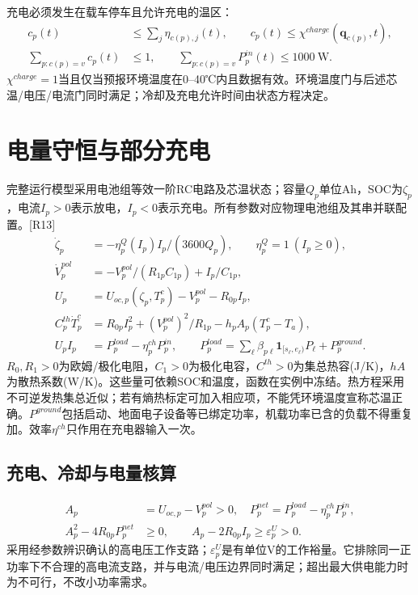 \noindent 充电必须发生在载车停车且允许充电的温区：
\begin{align}
 c_p(t)&\le\sum_j\eta_{c(p),j}(t),\qquad c_p(t)\le\chi^{charge}(\mathbf q_{c(p)},t),\\
 \sum_{p:c(p)=v}c_p(t)&\le1,\qquad
 \sum_{p:c(p)=v}P_p^{in}(t)\le1000\ \mathrm W.
 \label{eng:eq:chargingcapacity}
\end{align}
\noindent $\chi^{charge}=1$当且仅当预报环境温度在0--40℃内且数据有效。环境温度门与后述芯温/电压/电流门同时满足；冷却及充电允许时间由状态方程决定。
\clearpage

\section{电量守恒与部分充电}
\noindent 完整运行模型采用电池组等效一阶RC电路及芯温状态；容量$Q_p$单位Ah，SOC为$\zeta_p$，电流$I_p>0$表示放电，$I_p<0$表示充电。所有参数对应物理电池组及其串并联配置。[R13]
\begin{align}
 \dot\zeta_p&=-\eta_p^Q(I_p)I_p/(3600Q_p),\qquad
 \eta_p^Q=1\ (I_p\ge0),\label{eng:eq:battery}\\
 \dot V_p^{pol}&=-V_p^{pol}/(R_{1p}C_{1p})+I_p/C_{1p},\\
 U_p&=U_{oc,p}(\zeta_p,T_p^c)-V_p^{pol}-R_{0p}I_p,\label{eng:eq:ecm}\\
 C_p^{th}\dot T_p^c&=R_{0p}I_p^2+(V_p^{pol})^2/R_{1p}
                  -h_pA_p(T_p^c-T_a),\label{eng:eq:thermal}\\
 U_pI_p&=P_p^{load}-\eta_p^{ch}P_p^{in},\qquad
 P_p^{load}=\sum_\ell\beta_{p\ell}\mathbf1_{[s_\ell,e_\ell)}P_\ell+P_p^{ground}.
 \label{eng:eq:powerport}
\end{align}
\noindent $R_0,R_1>0$为欧姆/极化电阻，$C_1>0$为极化电容，$C^{th}>0$为集总热容(J/K)，$hA$为散热系数(W/K)。这些量可依赖SOC和温度，函数在实例中冻结。热方程采用不可逆发热集总近似；若有熵热标定可加入相应项，不能凭环境温度宣称芯温正确。$P^{ground}$包括启动、地面电子设备等已绑定功率，机载功率已含的负载不得重复加。效率$\eta^{ch}$只作用在充电器输入一次。
\clearpage\subsection*{充电、冷却与电量核算}
\begin{align}
 A_p&=U_{oc,p}-V_p^{pol}>0,\quad P_p^{net}=P_p^{load}-\eta_p^{ch}P_p^{in},\\
 A_p^2-4R_{0p}P_p^{net}&\ge0,\qquad A_p-2R_{0p}I_p\ge\varepsilon_p^U>0.
 \label{eng:eq:powerbranch}
\end{align}
\noindent 采用经参数辨识确认的高电压工作支路；$\varepsilon_p^U$是有单位V的工作裕量。它排除同一正功率下不合理的高电流支路，并与电流/电压边界同时满足；超出最大供电能力时为不可行，不改小功率需求。
